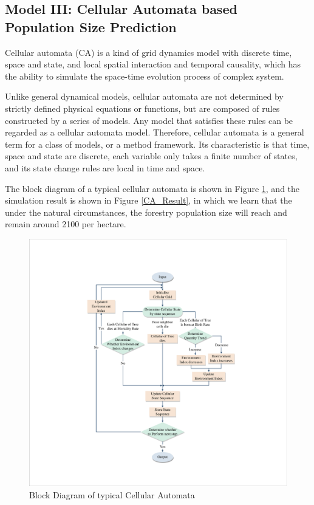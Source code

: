 \documentclass{mcmthesis}
\numberwithin{figure}{section}
\numberwithin{table}{section}
\numberwithin{equation}{section}
\begin{document}
\subsection{Model III: Cellular Automata based Population Size Prediction}

Cellular automata (CA) is a kind of grid dynamics model with discrete time, 
space and state, and local spatial interaction and temporal causality, which 
has the ability to simulate the space-time evolution process of complex system.
\par
Unlike general dynamical models, cellular automata are not determined by strictly 
defined physical equations or functions, but are composed of rules constructed by 
a series of models. Any model that satisfies these rules can be regarded as a cellular 
automata model. Therefore, cellular automata is a general term for a class of models, 
or a method framework. Its characteristic is that time, space and state are discrete, 
each variable only takes a finite number of states, and its state change rules are local 
in time and space.
\par
The block diagram of a typical cellular automata is shown in Figure \ref{CA_Fig}, 
and the simulation result is shown in Figure \ref{CA_Result}, in which
we learn that the under the natural circumstances, the forestry population size
will reach and remain around 2100 per hectare. 



\begin{figure}[htbp]
  \centering
  \includegraphics[width = 12cm]{code&pic/元胞自动机流程图.pdf}
  \caption{Block Diagram of typical Cellular Automata}\label{CA_Fig}
\end{figure}
\end{document}
